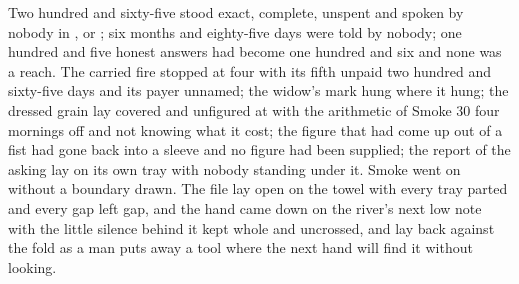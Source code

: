 Two hundred and sixty-five stood exact, complete, unspent and spoken by nobody in ,  or ; six months and eighty-five days were told by nobody; one hundred and five honest answers had become one hundred and six and none was a reach. The carried fire stopped at four with its fifth unpaid two hundred and sixty-five days and its payer unnamed; the widow's mark hung where it hung; the dressed grain lay covered and unfigured at  with the arithmetic of Smoke 30 four mornings off and not knowing what it cost; the figure that had come up out of a fist had gone back into a sleeve and no figure had been supplied; the report of the asking lay on its own tray with nobody standing under it. Smoke went on without a boundary drawn. The file lay open on the towel with every tray parted and every gap left gap, and the hand came down on the river's next low note with the little silence behind it kept whole and uncrossed, and lay back against the fold as a man puts away a tool where the next hand will find it without looking.
